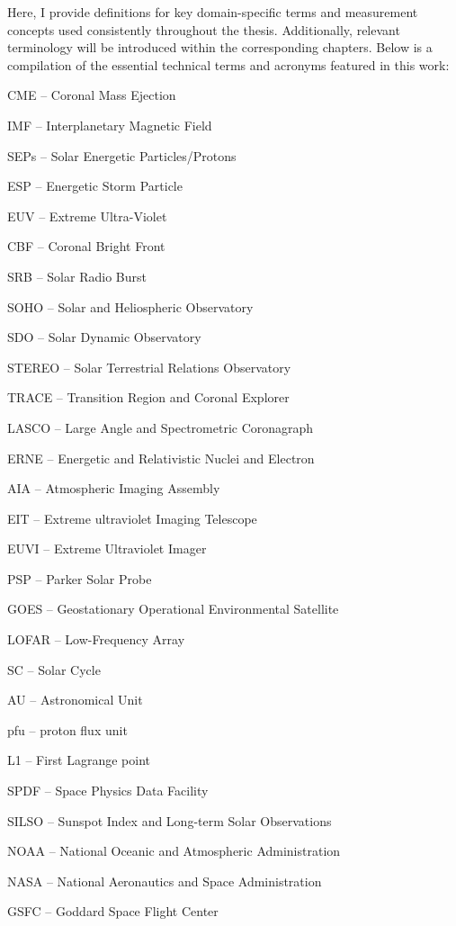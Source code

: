 Here, I provide definitions for key domain-specific terms and measurement concepts used consistently throughout the thesis. Additionally, relevant terminology will be introduced within the corresponding chapters. Below is a compilation of the essential technical terms and acronyms featured in this work:

\vspace{0.5cm}

CME -- Coronal Mass Ejection

IMF -- Interplanetary Magnetic Field

SEPs -- Solar Energetic Particles/Protons

ESP -- Energetic Storm Particle

EUV -- Extreme Ultra-Violet

CBF -- Coronal Bright Front

SRB -- Solar Radio Burst

SOHO -- Solar and Heliospheric Observatory

SDO -- Solar Dynamic Observatory

STEREO -- Solar Terrestrial Relations Observatory

TRACE -- Transition Region and Coronal Explorer

LASCO -- Large Angle and Spectrometric Coronagraph

ERNE -- Energetic and Relativistic Nuclei and Electron

AIA -- Atmospheric Imaging Assembly

EIT -- Extreme ultraviolet Imaging Telescope

EUVI -- Extreme Ultraviolet Imager

PSP -- Parker Solar Probe

GOES -- Geostationary Operational Environmental Satellite

LOFAR -- Low-Frequency Array

SC -- Solar Cycle

AU -- Astronomical Unit

pfu -- proton flux unit

L1 -- First Lagrange point

SPDF -- Space Physics Data Facility

SILSO -- Sunspot Index and Long-term Solar Observations

NOAA -- National Oceanic and Atmospheric Administration

NASA -- National Aeronautics and Space Administration

GSFC -- Goddard Space Flight Center

